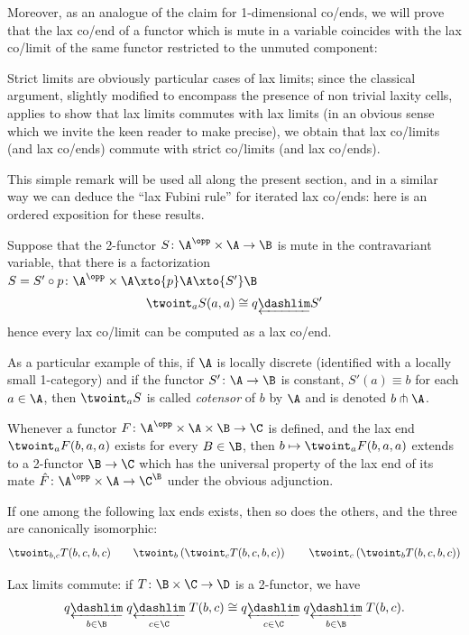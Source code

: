 Moreover, as an analogue of the claim for 1-dimensional co/ends, we will prove that the lax co/end of a functor which is mute in a variable coincides with the lax co/limit of the same functor restricted to the unmuted component:
\begin{remark}\label{laxlimcommute}
Strict limits are obviously particular cases of lax limits; since the classical argument, slightly modified to encompass the presence of non trivial laxity  cells, applies to show that lax limits commutes with lax limits (in an obvious sense which we invite the keen reader to make precise), we obtain that lax co/limits (and lax co/ends) commute with strict co/limits (and lax co/ends).
\end{remark}
This simple remark will be used all along the present section, and in a similar way we can deduce the ``lax Fubini rule'' for iterated lax co/ends: here is an ordered exposition for these results.
\begin{proposition}
Suppose that the 2-functor $S\colon \A^\opp\times\A \to \B$ is mute in the contravariant variable, \ie  that there is a factorization $S = S'\circ p\colon \A^\opp\times\A \xto{p} \A \xto{S'} \B$
\[
\twoint_a S(a,a)\cong q\underleftarrow{\dashlim} S'
\]
hence every lax co/limit can be computed as a lax co/end.
\end{proposition} 
\begin{example}
As a particular example of this, if $\A$ is locally discrete (\ie identified with a locally small 1-category) and if the functor $S'\colon \A\to \B$ is constant, \ie $S'(a) \equiv b$ for each $a\in \A$, then $\twoint_a S$ is called \emph{cotensor} of $b$ by $\A$ and is denoted $b\pitchfork \A$.
\end{example}
\begin{theorem}
Whenever a functor $F\colon \A^\opp\times \A\times \B\to \C$ is defined, and the lax end $\twoint_a F(b, a,a)$ exists for every $B\in \B$, then $b\mapsto \twoint_a F(b, a,a)$ extends to a 2-functor $\B\to \C$ which has the universal property of the lax end of its mate $\hat F\colon \A^\opp\times \A \to \C^{\B}$ under the obvious adjunction.
\end{theorem}
\begin{theorem}\label{laxfubini}
If one among the following lax ends exists, then so does the others, and the three are canonically isomorphic:
\[
\twoint_{b,c}T(b,c,b,c)\qquad \twoint_b\left(\twoint_c T(b,c,b,c)\right) \qquad \twoint_c\left(\twoint_b T(b,c,b,c)\right)
\]
\end{theorem}
\begin{corollary}
Lax limits commute: if $T\colon \B\times \C\to \D$ is a 2-functor, we have
\[
	q\underset{b\in \B}{\underleftarrow{\dashlim}}\;
	q\underset{c\in \C}{\underleftarrow{\dashlim}}\; T(b,c)
	\cong 
	q\underset{c\in \C}{\underleftarrow{\dashlim}} \; 
	q\underset{b\in \B}{\underleftarrow{\dashlim}} \;  T(b,c).
\]
\end{corollary}

